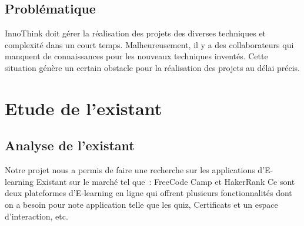 \vspace{5mm}
\subsection{Problématique}

InnoThink doit gérer la réalisation des projets des diverses techniques et complexité  dans un court temps. Malheureusement, il y a des collaborateurs qui manquent de connaissances pour les nouveaux techniques inventés. Cette situation génère un certain obstacle pour la réalisation des projets au délai précis.



\section{Etude de l'existant}
\subsection{Analyse de l'existant}
Notre projet nous a permis de faire une recherche sur les applications d’E-learning
Existant sur le marché tel que : FreeCode Camp et HakerRank
Ce sont deux plateformes d’E-learning en ligne qui offrent plusieurs fonctionnalités
dont on a besoin pour note application telle que les quiz, Certificats et un espace
d’interaction, etc.

